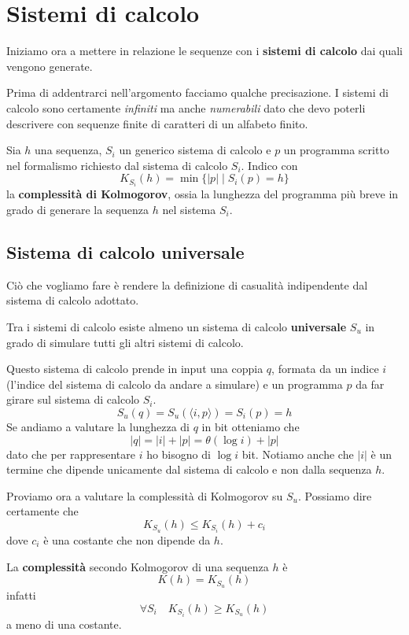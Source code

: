 \section{Sistemi di calcolo}
Iniziamo ora a mettere in relazione le sequenze con i \textbf{sistemi di calcolo} dai quali vengono generate.

Prima di addentrarci nell'argomento facciamo qualche precisazione. I sistemi di calcolo sono certamente \emph{infiniti}
ma anche \emph{numerabili} dato che devo poterli descrivere con sequenze finite di caratteri di un alfabeto finito.

\begin{definition}
	Sia $h$ una sequenza, $S_i$ un generico sistema di calcolo e $p$ un programma scritto nel formalismo richiesto dal
	sistema di calcolo $S_i$. Indico con
	\[ K_{S_i}(h) = \min\{ |p| \mid S_i(p) = h \} \]
	la \textbf{complessit\`a di Kolmogorov}, ossia la lunghezza del programma pi\`u breve in grado di generare la
	sequenza $h$ nel sistema $S_i$.
\end{definition}

\subsection{Sistema di calcolo universale}
Ci\`o che vogliamo fare \`e rendere la definizione di casualit\`a indipendente dal sistema di calcolo adottato.

Tra i sistemi di calcolo esiste almeno un sistema di calcolo \textbf{universale} $S_u$ in grado di simulare tutti gli
altri sistemi di calcolo.

Questo sistema di calcolo prende in input una coppia $q$, formata da un indice $i$ (l'indice del sistema di calcolo da
andare a simulare) e un programma $p$ da far girare sul sistema di calcolo $S_i$.
\[ S_u(q) =  S_u (\langle i, p \rangle) = S_i (p) = h \]
Se andiamo a valutare la lunghezza di $q$ in bit otteniamo che
\[ |q| = |i| + |p| = \theta (\log i) + |p| \]
dato che per rappresentare $i$ ho bisogno di $\log i$ bit. Notiamo anche che $|i|$ \`e un termine che dipende unicamente
dal sistema di calcolo e non dalla sequenza $h$.

Proviamo ora a valutare la complessit\`a di Kolmogorov su $S_u$. Possiamo dire certamente che
\[ K_{S_u}(h) \leq K_{S_i}(h) + c_i \]
dove $c_i$ \`e una costante che non dipende da $h$.

\begin{definition}
	La \textbf{complessit\`a} secondo Kolmogorov di una sequenza $h$ \`e
	\[ K(h) = K_{S_u}(h) \]
	infatti
	\[ \forall S_i \quad K_{S_i}(h) \geq K_{S_u}(h) \]
	a meno di una costante.
\end{definition}

